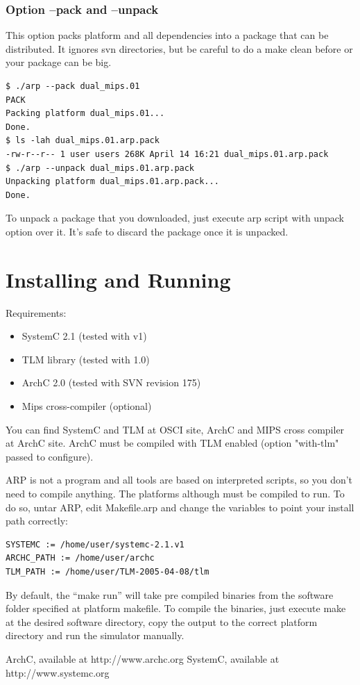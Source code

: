 \documentclass[12pt]{article}
\begin{document}
\subsubsection{Option --pack and --unpack}
This option packs platform and all dependencies into a package that can be distributed. It ignores svn directories, but be careful to do a make clean before or your package can be big.

\begin{verbatim}
$ ./arp --pack dual_mips.01
PACK
Packing platform dual_mips.01...
Done.
$ ls -lah dual_mips.01.arp.pack
-rw-r--r-- 1 user users 268K April 14 16:21 dual_mips.01.arp.pack
$ ./arp --unpack dual_mips.01.arp.pack
Unpacking platform dual_mips.01.arp.pack...
Done.
\end{verbatim}

To unpack a package that you downloaded, just execute arp script with unpack option over it. It's safe to discard the package once it is unpacked.

\section{Installing and Running}

Requirements:
\begin{itemize}
\item SystemC 2.1 (tested with v1)
\item TLM library (tested with 1.0)
\item ArchC 2.0 (tested with SVN revision 175)
\item Mips cross-compiler (optional)
\end{itemize}

You can find SystemC and TLM at OSCI \cite{OSCI} site, ArchC and MIPS
cross compiler at ArchC \cite{ARCHC} site. ArchC must be compiled with
TLM enabled (option "with-tlm" passed to configure).

ARP is not a program and all tools are based on interpreted scripts, so you don't need to compile anything. The platforms although must be compiled to run.
To do so, untar ARP, edit Makefile.arp and change the variables to point
your install path correctly:

\begin{verbatim}
SYSTEMC := /home/user/systemc-2.1.v1
ARCHC_PATH := /home/user/archc
TLM_PATH := /home/user/TLM-2005-04-08/tlm
\end{verbatim}

By default, the ``make run'' will take pre compiled binaries from the software folder specified at platform makefile. To compile the binaries, just
execute make at the desired software directory, copy the output to
the correct platform directory and run the simulator manually.

\begin{thebibliography}{99}

 ArchC, available at http://www.archc.org
 SystemC, available at http://www.systemc.org

\end{thebibliography}
\end{document}
